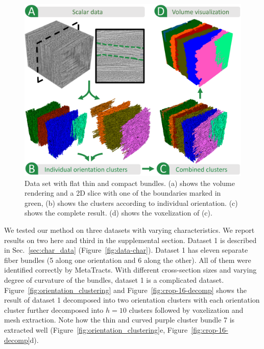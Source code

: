 \begin{figure}[tb]
\centering
	\includegraphics[width=\linewidth]{images_pvis/dataset2.pdf}
	\caption{Data set with flat thin and compact bundles. (a) shows the volume rendering and a 2D slice with one of the boundaries marked in green, (b) shows the clusters according to individual orientation. (c) shows the complete result. (d) shows the voxelization of (c).}
	\label{fig:prepreg}
\end{figure}


We tested our method on three datasets with varying characteristics. We report results on two here and third in the supplemental section.  
Dataset 1 is described in Sec.~\ref{sec:char_data} (Figure~\ref{fig:data-char}). Dataset 1 has eleven separate fiber bundles (5 along one orientation and 6 along the other). All of them were identified correctly by MetaTracts. With different cross-section sizes and varying degree of curvature of the bundles, dataset 1 is a complicated dataset.
Figure~\ref{fig:orientation_clustering} and Figure~\ref{fig:crop-16-decomp} shows the result of dataset 1 decomposed into two orientation clusters with each orientation cluster further decomposed into $h=10$ clusters followed by voxelization and mesh extraction. Note how the thin and curved purple cluster bundle 7 is extracted well (Figure~\ref{fig:orientation_clustering}e, Figure~\ref{fig:crop-16-decomp}d). 

